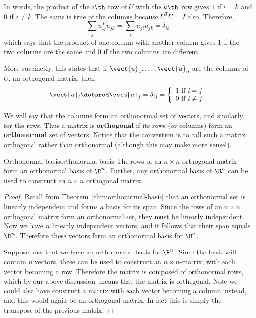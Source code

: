 In words, the product of the $i\th$ row of $U$ with the $k\th$ row
gives $1$ if $i=k$ and $0$ if $i\neq k$. The same is true of the columns because
$U^{T}U=I$ also. Therefore,
\begin{equation*}
\sum_{j}u_{ij}^{T}u_{jk}=\sum_{j}u_{ji}u_{jk}=\delta _{ik}
\end{equation*}
which says that the product of one column with another column gives $1$ if the two
columns are the same and $0$ if the two columns are different.

More succinctly, this states that if $\vect{u}_{1},\ldots,\vect{u}_{n}$
are the columns of $U$, an orthogonal matrix, then
\[
\vect{u}_{i}\dotprod \vect{u}_{j}=\delta _{ij} = \left\{
\begin{array}{c}
1\text{ if }i=j \\
0\text{ if }i\neq j
\end{array}
\right.
\]

We will say that the columns form an orthonormal set of vectors, and similarly for the rows. Thus a matrix is \textbf{orthogonal} if its rows (or columns) form an
\textbf{orthonormal} set of vectors. Notice that the convention is to call such a matrix orthogonal rather than orthonormal (although this may make more sense!).

\begin{proposition}{Orthonormal basis}{orthonormal-basis}
The rows of an $n \times n$ orthogonal matrix form an orthonormal
basis of $\R^n$. Further, any orthonormal basis of
$\R^n$ can be used to construct an $n \times n$ orthogonal
matrix.
\end{proposition}

\begin{proof}
Recall from Theorem~\ref{thm:orthonormal-basis} that an orthonormal set is
linearly independent and forms a basis for its span. Since the rows of
an $n \times n$ orthogonal matrix form an orthonormal set, they must
be linearly independent. Now we have $n$ linearly independent vectors,
and it follows that their span equals $\R^n$. Therefore these
vectors form an orthonormal basis for $\R^n$.

Suppose now that we have an orthonormal basis for $\R^n$. Since the
basis will contain $n$ vectors, these can be used to construct an $n
\times n$-matrix, with each vector becoming a row. Therefore the
matrix is composed of orthonormal rows, which by our above discussion,
means that the matrix is orthogonal. Note we could also have construct
a matrix with each vector becoming a column instead, and this would
again be an orthogonal matrix. In fact this is simply the transpose of
the previous matrix.
\end{proof}

